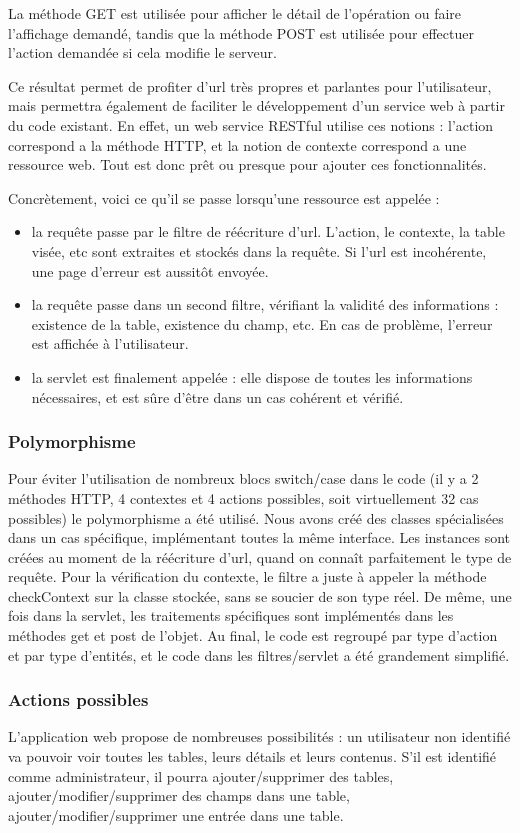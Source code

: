 La méthode GET est utilisée pour afficher le détail de l'opération ou faire l'affichage demandé, tandis que la méthode POST est utilisée pour effectuer l'action demandée si cela modifie le serveur.

Ce résultat permet de profiter d'url très propres et parlantes pour l'utilisateur, mais permettra également de faciliter le développement d'un service web à partir du code existant. En effet, un web service RESTful utilise ces notions : l'action correspond a la méthode HTTP, et la notion de contexte correspond a une ressource web. Tout est donc prêt ou presque pour ajouter ces fonctionnalités.

Concrètement, voici ce qu'il se passe lorsqu'une ressource est appelée :
\begin{itemize}
	\item la requête passe par le filtre de réécriture d'url. L'action, le contexte, la table visée, etc sont extraites et stockés dans la requête. Si l'url est incohérente, une page d'erreur est aussitôt envoyée.
	\item la requête passe dans un second filtre, vérifiant la validité des informations : existence de la table, existence du champ, etc. En cas de problème, l'erreur est affichée à l'utilisateur.
	\item la servlet est finalement appelée : elle dispose de toutes les informations nécessaires, et est sûre d'être dans un cas cohérent et vérifié.
\end{itemize}

\subsubsection{Polymorphisme}
Pour éviter l'utilisation de nombreux blocs switch/case dans le code (il y a 2 méthodes HTTP, 4 contextes et 4 actions possibles, soit virtuellement 32 cas possibles) le polymorphisme a été utilisé. Nous avons créé des classes spécialisées dans un cas spécifique, implémentant toutes la même interface. Les instances sont créées au moment de la réécriture d'url, quand on connaît parfaitement le type de requête. Pour la vérification du contexte, le filtre a juste à appeler la méthode checkContext sur la classe stockée, sans se soucier de son type réel. De même, une fois dans la servlet, les traitements spécifiques sont implémentés dans les méthodes get et post de l'objet. Au final, le code est regroupé par type d'action et par type d'entités, et le code dans les filtres/servlet a été grandement simplifié.

\subsubsection{Actions possibles}
L'application web propose de nombreuses possibilités : un utilisateur non identifié va pouvoir voir toutes les tables, leurs détails et leurs contenus.
S'il est identifié comme administrateur, il pourra ajouter/supprimer des tables, ajouter/modifier/supprimer des champs dans une table, ajouter/modifier/supprimer une entrée dans une table.
